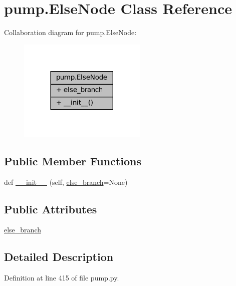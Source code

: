 \hypertarget{classpump_1_1ElseNode}{}\section{pump.\+Else\+Node Class Reference}
\label{classpump_1_1ElseNode}


Collaboration diagram for pump.\+Else\+Node\+:
\nopagebreak
\begin{figure}[H]
\begin{center}
\leavevmode
\includegraphics[width=173pt]{classpump_1_1ElseNode__coll__graph}
\end{center}
\end{figure}
\subsection*{Public Member Functions}
\begin{DoxyCompactItemize}
\item 
def \hyperlink{classpump_1_1ElseNode_a7489ff8c6c7ddfe6bd6593b8ecccd819}{\+\_\+\+\_\+init\+\_\+\+\_\+} (self, \hyperlink{classpump_1_1ElseNode_ac838a0fe9f5d713c7f56939eed5e128d}{else\+\_\+branch}=None)
\end{DoxyCompactItemize}
\subsection*{Public Attributes}
\begin{DoxyCompactItemize}
\item 
\hyperlink{classpump_1_1ElseNode_ac838a0fe9f5d713c7f56939eed5e128d}{else\+\_\+branch}
\end{DoxyCompactItemize}


\subsection{Detailed Description}


Definition at line 415 of file pump.\+py.



